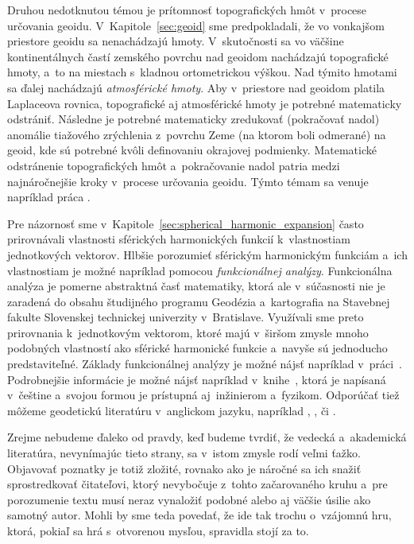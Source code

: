 \documentclass[a4paper, 12pt]{book}
\begin{document}
Druhou nedotknutou témou je prítomnosť topografických hmôt v~procese určovania 
geoidu.  V~Kapitole~\ref{sec:geoid} sme predpokladali, že vo vonkajšom 
priestore geoidu sa nenachádzajú hmoty.  V~skutočnosti sa vo väčšine 
kontinentálnych častí zemského povrchu nad geoidom nachádzajú topografické 
hmoty, a~to na miestach s~kladnou ortometrickou výškou.  Nad týmito hmotami sa 
ďalej nachádzajú \emph{atmosférické hmoty}.  Aby v~priestore nad geoidom 
platila Laplaceova rovnica, topografické aj atmosférické hmoty je potrebné 
matematicky odstrániť.  Následne je potrebné matematicky zredukovať (pokračovať 
nadol) anomálie tiažového zrýchlenia z~povrchu Zeme (na ktorom boli odmerané) 
na geoid, kde sú potrebné kvôli definovaniu okrajovej podmienky.  Matematické 
odstránenie topografických hmôt a~pokračovanie nadol patria medzi 
najnáročnejšie kroky v~procese určovania geoidu.  Týmto témam sa venuje 
napríklad práca \textcite{Janak2006}.

Pre názornosť sme v~Kapitole~\ref{sec:spherical_harmonic_expansion} často 
prirovnávali vlastnosti sférických harmonických funkcií k~vlastnostiam 
jednotkových vektorov.  Hlbšie porozumieť sférickým harmonickým funkciám a~ich 
vlastnostiam je možné napríklad pomocou \emph{funkcionálnej analýzy}.  
Funkcionálna analýza je pomerne abstraktná časť matematiky, ktorá ale 
v~súčasnosti nie je zaradená do obsahu študijného programu Geodézia 
a~kartografia na Stavebnej fakulte Slovenskej technickej univerzity 
v~Bratislave.  Využívali sme preto prirovnania k~jednotkovým vektorom, ktoré 
majú v~širšom zmysle mnoho podobných vlastností ako sférické harmonické funkcie 
a~navyše sú jednoducho predstaviteľné.  Základy funkcionálnej analýzy je možné 
nájsť napríklad v~práci~\textcite{Janak2006}.  Podrobnejšie informácie je možné 
nájsť napríklad v~knihe~\textcite{Rektorys}, ktorá je napísaná v~češtine 
a~svojou formou je prístupná aj~inžinierom a~fyzikom.  Odporúčať tiež môžeme 
geodetickú literatúru v~anglickom jazyku, napríklad 
\textcite{MoritzAdvancedGeodesy}, \textcite{SansoGeoidDetermination}, 
\textcite{Borre2006} či \textcite{Freeden2009}.

Zrejme nebudeme ďaleko od pravdy, keď budeme tvrdiť, že vedecká a~akademická 
literatúra, nevynímajúc tieto strany, sa v~istom zmysle rodí veľmi ťažko.  
Objavovať poznatky je totiž zložité, rovnako ako je náročné sa ich snažiť 
sprostredkovať čitateľovi, ktorý nevybočuje z~tohto začarovaného kruhu a~pre 
porozumenie textu musí neraz vynaložiť podobné alebo aj väčšie úsilie ako 
samotný autor.  Mohli by sme teda povedať, že ide tak trochu o~vzájomnú hru, 
ktorá, pokiaľ sa hrá s~otvorenou mysľou, spravidla stojí za to.
\end{document}
